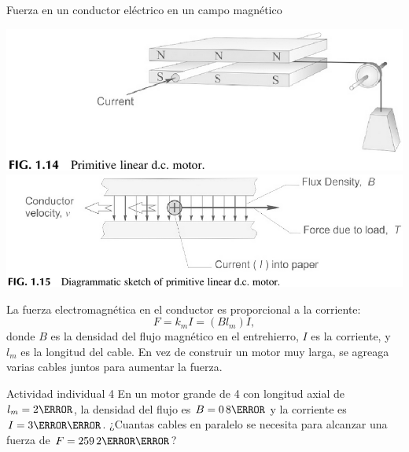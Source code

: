 \documentclass[presentation,aspectratio=169]{beamer}
\begin{document}
\begin{frame}[label={sec:orgce9e7b6}]{Fuerza en un conductor eléctrico en un campo magnético}
\begin{center}
\includegraphics[width=0.4\linewidth]{../../figures/HD-fig1_14.png}
\includegraphics[width=0.53\linewidth]{../../figures/HD-fig1_15.png}
\end{center}

La fuerza electromagnética en el conductor es \alert{proporcional a la corriente}:
\[F=k_mI=(Bl_m)I,\] donde \(B\) es la densidad del flujo magnético en el entrehierro, \(I\) es la corriente, y \(l_m\) es la longitud del cable. En vez de construir un motor muy larga, se agreaga varias cables juntos para aumentar la fuerza.

\alert{Actividad individual 4} En un motor grande de \unit{4}{\mega\watt} con longitud axial de \(l_m=\unit{2}{\meter}\), la densidad del flujo es \(B=\unit{0.8}{\tesla}\) y la corriente es \(I=\unit{3}{\kilo\ampere}\). ¿Cuantas cables en paralelo se necesita para alcanzar una fuerza de \(F=\unit{259.2}{\kilo\newton}\)?
\end{frame}
\end{document}
